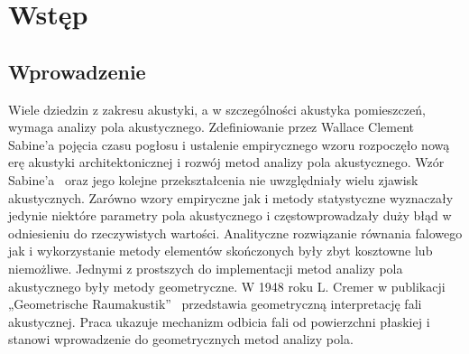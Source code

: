 \chapter{Wstęp}\label{cha:wstep}


\section{Wprowadzenie}\label{sec:wprowadzenie}

Wiele  dziedzin z zakresu akustyki, a w szczególności akustyka pomieszczeń, wymaga analizy pola akustycznego. Zdefiniowanie przez Wallace Clement Sabine’a pojęcia czasu pogłosu i ustalenie empirycznego wzoru rozpoczęło nową erę akustyki architektonicznej i rozwój metod analizy pola akustycznego. Wzór Sabine'a~\cite{b1} oraz jego kolejne przekształcenia nie uwzględniały wielu zjawisk akustycznych. Zarówno wzory empiryczne  jak i metody statystyczne wyznaczały jedynie niektóre parametry pola akustycznego i częstowprowadzały duży błąd w odniesieniu do rzeczywistych wartości. Analityczne rozwiązanie równania falowego  jak i wykorzystanie metody elementów skończonych były zbyt kosztowne lub niemożliwe. Jednymi z prostszych do implementacji metod analizy pola akustycznego były metody geometryczne. W 1948 roku L. Cremer w publikacji „Geometrische Raumakustik”~\cite{b2} przedstawia geometryczną interpretację fali akustycznej. Praca ukazuje mechanizm odbicia fali od powierzchni płaskiej i stanowi wprowadzenie do geometrycznych metod analizy pola.

